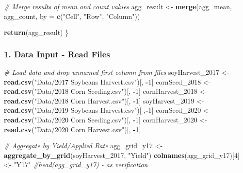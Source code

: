 \documentclass[
]{article}
\newenvironment{Shaded}{\begin{snugshade}}{\end{snugshade}}
\newcommand{\AttributeTok}[1]{\textcolor[rgb]{0.13,0.29,0.53}{#1}}
\newcommand{\CommentTok}[1]{\textcolor[rgb]{0.56,0.35,0.01}{\textit{#1}}}
\newcommand{\DecValTok}[1]{\textcolor[rgb]{0.00,0.00,0.81}{#1}}
\newcommand{\FunctionTok}[1]{\textcolor[rgb]{0.13,0.29,0.53}{\textbf{#1}}}
\newcommand{\NormalTok}[1]{#1}
\newcommand{\OtherTok}[1]{\textcolor[rgb]{0.56,0.35,0.01}{#1}}
\newcommand{\SpecialCharTok}[1]{\textcolor[rgb]{0.81,0.36,0.00}{\textbf{#1}}}
\newcommand{\StringTok}[1]{\textcolor[rgb]{0.31,0.60,0.02}{#1}}
\begin{document}
\begin{Shaded}
\begin{Highlighting}[]
  \CommentTok{\# Merge results of mean and count values}
\NormalTok{  agg\_result }\OtherTok{\textless{}{-}} \FunctionTok{merge}\NormalTok{(agg\_mean, agg\_count, }\AttributeTok{by =} \FunctionTok{c}\NormalTok{(}\StringTok{"Cell"}\NormalTok{, }\StringTok{"Row"}\NormalTok{, }\StringTok{"Column"}\NormalTok{))}

  \FunctionTok{return}\NormalTok{(agg\_result)}
\NormalTok{\}}
\end{Highlighting}
\end{Shaded}

\subsubsection{1. Data Input - Read
Files}\label{data-input---read-files}

\begin{Shaded}
\begin{Highlighting}[]
\CommentTok{\# Load data and drop unnamed first column from files}
\NormalTok{soyHarvest\_2017 }\OtherTok{\textless{}{-}} \FunctionTok{read.csv}\NormalTok{(}\StringTok{"Data/2017 Soybeans Harvest.csv"}\NormalTok{)[, }\SpecialCharTok{{-}}\DecValTok{1}\NormalTok{]}
\NormalTok{cornSeed\_2018 }\OtherTok{\textless{}{-}} \FunctionTok{read.csv}\NormalTok{(}\StringTok{"Data/2018 Corn Seeding.csv"}\NormalTok{)[, }\SpecialCharTok{{-}}\DecValTok{1}\NormalTok{]}
\NormalTok{cornHarvest\_2018 }\OtherTok{\textless{}{-}} \FunctionTok{read.csv}\NormalTok{(}\StringTok{"Data/2018 Corn Harvest.csv"}\NormalTok{)[, }\SpecialCharTok{{-}}\DecValTok{1}\NormalTok{]}
\NormalTok{soyHarvest\_2019 }\OtherTok{\textless{}{-}} \FunctionTok{read.csv}\NormalTok{(}\StringTok{"Data/2019 Soybeans Harvest.csv"}\NormalTok{)[ ,}\SpecialCharTok{{-}}\DecValTok{1}\NormalTok{]}
\NormalTok{cornSeed\_2020 }\OtherTok{\textless{}{-}} \FunctionTok{read.csv}\NormalTok{(}\StringTok{"Data/2020 Corn Seeding.csv"}\NormalTok{)[, }\SpecialCharTok{{-}}\DecValTok{1}\NormalTok{]}
\NormalTok{cornHarvest\_2020 }\OtherTok{\textless{}{-}} \FunctionTok{read.csv}\NormalTok{(}\StringTok{"Data/2020 Corn Harvest.csv"}\NormalTok{)[, }\SpecialCharTok{{-}}\DecValTok{1}\NormalTok{]}

\CommentTok{\# Aggregate by Yield/Applied Rate}
\NormalTok{agg\_grid\_y17 }\OtherTok{\textless{}{-}} \FunctionTok{aggregate\_by\_grid}\NormalTok{(soyHarvest\_2017, }\StringTok{"Yield"}\NormalTok{)}
\FunctionTok{colnames}\NormalTok{(agg\_grid\_y17)[}\DecValTok{4}\NormalTok{] }\OtherTok{\textless{}{-}} \StringTok{"Y17"}
\CommentTok{\#head(agg\_grid\_y17) {-} as verification}


\end{Highlighting}
\end{Shaded}
\end{document}
